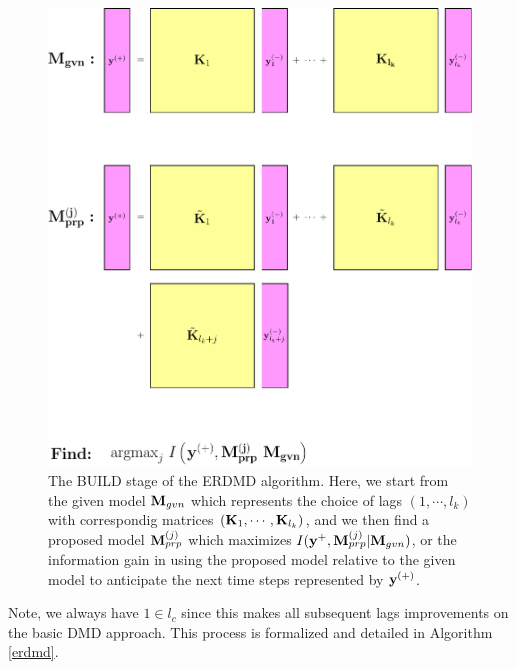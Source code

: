 \documentclass[a4paper,11pt]{article}
\begin{document}
\begin{figure}
\centering
\includegraphics[scale=.75]{square_games-pics}
\caption{The BUILD stage of the ERDMD algorithm.  Here, we start from the given model ${\bf M}_{gvn}$ which represents the choice of lags $(1, \cdots, l_{k})$ with correspondig matrices $({\bf K}_{1}, \cdots, {\bf K}_{l_{k}})$, and we then find a proposed model ${\bf M}^{(j)}_{prp}$ which maximizes $I({\bf y}^{+}, {\bf M}^{(j)}_{prp}|{\bf M}_{gvn})$, or the information gain in using the proposed model relative to the given model to anticipate the next time steps represented by ${\bf y}^{(+)}$.}  
\label{fig:build_stage}
\end{figure}
Note, we always have $1\in l_{c}$ since this makes all subsequent lags improvements on the basic DMD approach.  This process is formalized and detailed in Algorithm \ref{erdmd}.  
\end{document}
